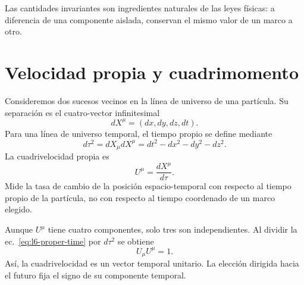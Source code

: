 Las cantidades invariantes son ingredientes naturales de las leyes físicas: a diferencia de una componente aislada, conservan el mismo valor de un marco a otro.

\section{Velocidad propia y cuadrimomento}

Consideremos dos sucesos vecinos en la línea de universo de una partícula. Su separación es el cuatro-vector infinitesimal \begin{equation}
  dX^\mu=(dx,dy,dz,dt).
\end{equation} Para una línea de universo temporal, el tiempo propio se define mediante \begin{equation}
  d\tau^2=dX_\mu dX^\mu
  =dt^2-dx^2-dy^2-dz^2.                                  \label{eq:l6-proper-time}
\end{equation} La cuadrivelocidad propia es \begin{equation}
  U^\mu=\frac{dX^\mu}{d\tau}.                            \label{eq:l6-four-velocity}
\end{equation} Mide la tasa de cambio de la posición espacio-temporal con respecto al tiempo propio de la partícula, no con respecto al tiempo coordenado de un marco elegido.

Aunque \(U^\mu\) tiene cuatro componentes, solo tres son independientes. Al dividir la ec.~\eqref{eq:l6-proper-time} por \(d\tau^2\) se obtiene \begin{equation}
  U_\mu U^\mu=1.
\end{equation} Así, la cuadrivelocidad es un vector temporal unitario. La elección dirigida hacia el futuro fija el signo de su componente temporal.

\begin{classroomqa}\end{classroomqa}

